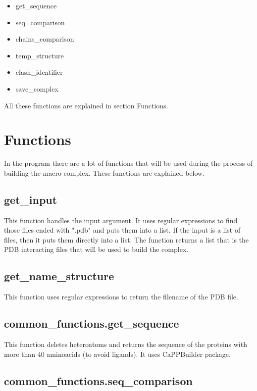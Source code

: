 \documentclass[a4paper,10pt]{report}
\begin{document}
\begin{itemize}
 \item get\_sequence
 \item seq\_comparison
 \item chains\_comparison
 \item temp\_structure
 \item clash\_identifier
 \item save\_complex
\end{itemize}

\noindent
All these functions are explained in section Functions.

\section{Functions}

In the program there are a lot of functions that will be used during the process of building the macro-complex. These functions are explained below.

\subsection{get\_input}

This function handles the input argument. It uses regular expressions to find those files ended with ".pdb" and puts them into a list. If the input is a list of files, then it puts them directly into a list. The function returns a list that is the PDB interacting files that will be used to build the complex.

\subsection{get\_name\_structure}

This function uses regular expressions to return the filename of the PDB file.

\subsection{common\_functions.get\_sequence}

This function deletes heteroatoms and returns the sequence of the proteins with more than 40 aminoacids (to avoid ligands). It uses CaPPBuilder package.

\subsection{common\_functions.seq\_comparison}
\end{document}
